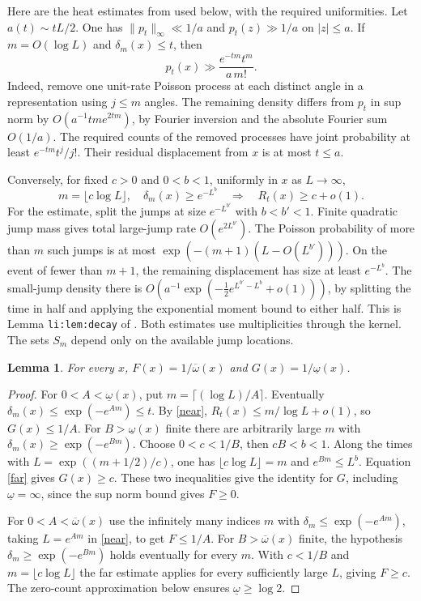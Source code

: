 \documentclass[11pt]{article}
\newtheorem{lemma}[theorem]{Lemma}
\newcommand{\upexp}{\overline\omega}
\newcommand{\lowexp}{\underline\omega}
\newcommand{\ranked}[1]{\textup{\texttt{#1}}}
\begin{document}
Here are the heat estimates from \cite{repoLi,repoRec} used below, with the required uniformities. Let $a(t)\sim tL/2$. One has $\|p_t\|_\infty\ll1/a$ and $p_t(z)\gg 1/a$ on $|z|\le a$. If $m=O(\log L)$ and $\delta_m(x)\le t$, then
\begin{equation}\label{near}
 p_t(x)\gg \frac{e^{-tm}t^m}{a\,m!}.
\end{equation}
Indeed, remove one unit-rate Poisson process at each distinct angle in a representation using $j\le m$ angles. The remaining density differs from $p_t$ in sup norm by $O(a^{-1}tm e^{2tm})$, by Fourier inversion and the absolute Fourier sum $O(1/a)$. The required counts of the removed processes have joint probability at least $e^{-tm}t^j/j!$. Their residual displacement from $x$ is at most $t\le a$.

Conversely, for fixed $c>0$ and $0<b<1$, uniformly in $x$ as $L\to\infty$,
\begin{equation}\label{far}
 m=\lfloor c\log L\rfloor,\quad \delta_m(x)\ge e^{-L^b}
 \quad\Longrightarrow\quad R_t(x)\ge c+o(1).
\end{equation}
For the estimate, split the jumps at size $e^{-L^{b'}}$ with $b<b'<1$. Finite quadratic jump mass gives total large-jump rate $O(e^{2L^{b'}})$. The Poisson probability of more than $m$ such jumps is at most $\exp(-(m+1)(L-O(L^{b'})))$. On the event of fewer than $m+1$, the remaining displacement has size at least $e^{-L^b}$. The small-jump density there is $O(a^{-1}\exp(-\tfrac12e^{L^{b'}-L^b}+o(1)))$, by splitting the time in half and applying the exponential moment bound to either half. This is Lemma \ranked{li:lem:decay} of \cite{repoLi}. Both estimates use multiplicities through the kernel. The sets $S_m$ depend only on the available jump locations.

\begin{lemma}\label{lem:transfer}
For every $x$, $F(x)=1/\upexp(x)$ and $G(x)=1/\lowexp(x)$.
\end{lemma}
\begin{proof}
For $0<A<\lowexp(x)$, put $m=\lceil (\log L)/A\rceil$. Eventually $\delta_m(x)\le\exp(-e^{Am})\le t$. By \eqref{near}, $R_t(x)\le m/\log L+o(1)$, so $G(x)\le1/A$. For $B>\lowexp(x)$ finite there are arbitrarily large $m$ with $\delta_m(x)\ge\exp(-e^{Bm})$. Choose $0<c<1/B$, then $cB<b<1$. Along the times with $L=\exp((m+1/2)/c)$, one has $\lfloor c\log L\rfloor=m$ and $e^{Bm}\le L^b$. Equation \eqref{far} gives $G(x)\ge c$. These two inequalities give the identity for $G$, including $\lowexp=\infty$, since the sup norm bound gives $F\ge0$.

For $0<A<\upexp(x)$ use the infinitely many indices $m$ with $\delta_m\le\exp(-e^{Am})$, taking $L=e^{Am}$ in \eqref{near}, to get $F\le1/A$. For $B>\upexp(x)$ finite, the hypothesis $\delta_m\ge\exp(-e^{Bm})$ holds eventually for every $m$. With $c<1/B$ and $m=\lfloor c\log L\rfloor$ the far estimate applies for every sufficiently large $L$, giving $F\ge c$. The zero-count approximation below ensures $\lowexp\ge\log2$.
\end{proof}
\end{document}
